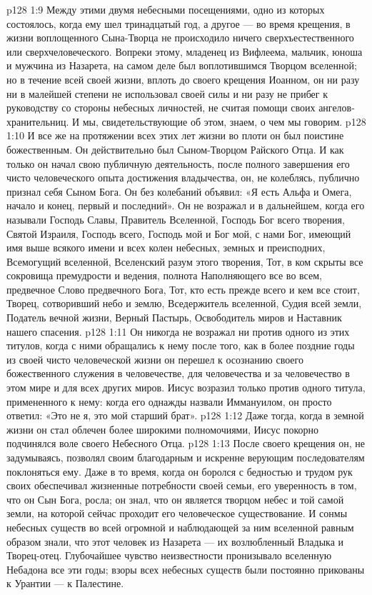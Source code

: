 \vs p128 1:9 Между этими двумя небесными посещениями, одно из которых состоялось, когда ему шел тринадцатый год, а другое --- во время крещения, в жизни воплощенного Сына\hyp{}Творца не происходило ничего сверхъестественного или сверхчеловеческого. Вопреки этому, младенец из Вифлеема, мальчик, юноша и мужчина из Назарета, на самом деле был воплотившимся Творцом вселенной; но в течение всей своей жизни, вплоть до своего крещения Иоанном, он ни разу ни в малейшей степени не использовал своей силы и ни разу не прибег к руководству со стороны небесных личностей, не считая помощи своих ангелов\hyp{}хранительниц. И мы, свидетельствующие об этом, знаем, о чем мы говорим.
\vs p128 1:10 И все же на протяжении всех этих лет жизни во плоти он был поистине божественным. Он действительно был Сыном\hyp{}Творцом Райского Отца. И как только он начал свою публичную деятельность, после полного завершения его чисто человеческого опыта достижения владычества, он, не колеблясь, публично признал себя Сыном Бога. Он без колебаний объявил: «Я есть Альфа и Омега, начало и конец, первый и последний». Он не возражал и в дальнейшем, когда его называли Господь Славы, Правитель Вселенной, Господь Бог всего творения, Святой Израиля, Господь всего, Господь мой и Бог мой, с нами Бог, имеющий имя выше всякого имени и всех колен небесных, земных и преисподних, Всемогущий вселенной, Вселенский разум этого творения, Тот, в ком скрыты все сокровища премудрости и ведения, полнота Наполняющего все во всем, предвечное Слово предвечного Бога, Тот, кто есть прежде всего и кем все стоит, Творец, сотворивший небо и землю, Вседержитель вселенной, Судия всей земли, Податель вечной жизни, Верный Пастырь, Освободитель миров и Наставник нашего спасения.
\vs p128 1:11 \pc Он никогда не возражал ни против одного из этих титулов, когда с ними обращались к нему после того, как в более поздние годы из своей чисто человеческой жизни он перешел к осознанию своего божественного служения в человечестве, для человечества и за человечество в этом мире и для всех других миров. Иисус возразил только против одного титула, примененного к нему: когда его однажды назвали Иммануилом, он просто ответил: «Это не я, это мой старший брат».
\vs p128 1:12 Даже тогда, когда в земной жизни он стал облечен более широкими полномочиями, Иисус покорно подчинялся воле своего Небесного Отца.
\vs p128 1:13 После своего крещения он, не задумываясь, позволял своим благодарным и искренне верующим последователям поклоняться ему. Даже в то время, когда он боролся с бедностью и трудом рук своих обеспечивал жизненные потребности своей семьи, его уверенность в том, что он Сын Бога, росла; он знал, что он является творцом небес и той самой земли, на которой сейчас проходит его человеческое существование. И сонмы небесных существ во всей огромной и наблюдающей за ним вселенной равным образом знали, что этот человек из Назарета --- их возлюбленный Владыка и Творец\hyp{}отец. Глубочайшее чувство неизвестности пронизывало вселенную Небадона все эти годы; взоры всех небесных существ были постоянно прикованы к Урантии --- к Палестине.
